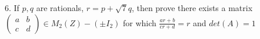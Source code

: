 6. If $ p,q$ are rationals, $r=p+\sqrt{7}q$, then prove there exists a matrix
$\left(\begin{array}{cc}a&b\\c&d\end{array}\right) \in M_{2}(Z)- ( \pm I_{2})$
for which $\frac{ar+b}{cr+d}=r$ and $det(A)=1$